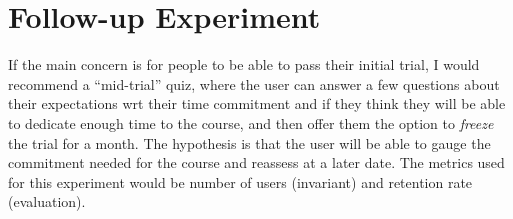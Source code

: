 \documentclass[12pt,a4paper]{article}
\begin{document}
\section{Follow-up Experiment}
If the main concern is for people to be able to pass their initial trial, I
would recommend a ``mid-trial'' quiz, where the user can answer a few
questions about their expectations wrt their time commitment and if they think
they will be able to dedicate enough time to the course, and then offer them the
option to \emph{freeze} the trial for a month. The hypothesis is that the user
will be able to gauge the commitment needed for the course and reassess at a
later date.
The metrics used for this experiment would be number of users (invariant) and
retention rate (evaluation).
\end{document}
